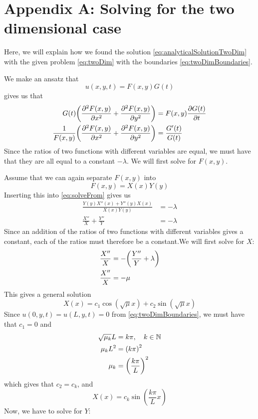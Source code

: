 \section{Appendix A: Solving for the two dimensional case}
Here, we will explain how we found the solution \vref{eq:analyticalSolutionTwoDim} with the given problem \vref{eq:twoDim} with the boundaries \vref{eq:twoDimBoundaries}.


We make an ansatz that
\[
u(x,y,t) = F(x,y)G(t)
\]
 gives us that
\begin{align}
G(t)\qty(\pdv[2]{F(x,y)}{x}+ \pdv[2]{F(x,y)}{y} ) &= F(x,y)\pdv{G(t)}{t} \nonumber\\
\frac{1}{F(x,y)}\qty(\pdv[2]{F(x,y)}{x}+ \pdv[2]{F(x,y)}{y} ) &= \frac{G'(t)}{G(t)} \label{eq:solveFrom}
\end{align}
Since the ratios of two functions with different variables are equal, we must have that they are all equal to a constant \(-\lambda\). We will first solve for \(F(x,y)\).

Assume that we can again separate \(F(x,y)\) into
\[
F(x,y) = X(x)Y(y)
\]
Inserting this into \vref{eq:solveFrom} gives us
\begin{align*}
\frac{Y(y)X''(x)+ Y''(y)X(x)}{X(x)Y(y)} &= -\lambda \\
\frac{X''}{X}+ \frac{Y''}{Y} &= -\lambda
\end{align*}
Since an addition of the ratios of two functions with different variables gives a constant, each of the ratios must therefore be a constant.We will first solve for \(X\):
\begin{align}
\frac{X''}{X} &= -\qty(\frac{Y''}{Y} +\lambda) \label{eq:mysteriousMu}\\
\frac{X''}{X} &= -\mu \nonumber
\end{align}
This gives a general solution
\[
X(x) = c_1\cos(\sqrt{\mu}x) + c_2\sin(\sqrt{\mu}x)
\]
Since \(u(0,y,t) = u(L,y,t) = 0\) from \vref{eq:twoDimBoundaries}, we must have that \(c_1 = 0\) and
\begin{align}
\sqrt{\mu_k}L &= k\pi \nonumber , \quad k \in \mathbb{N}\\
\mu_k L^2 &= \qty(k\pi)^2 \nonumber \\
 \mu_k  &=\qty(\frac{k\pi}{L})^2 \label{eq:twoDimMu}
\end{align}
which gives that \(c_2 = c_k\), and
\[
X(x) = c_k\sin(\frac{k\pi}{L}x)
\]
Now, we have to solve for \(Y\):

